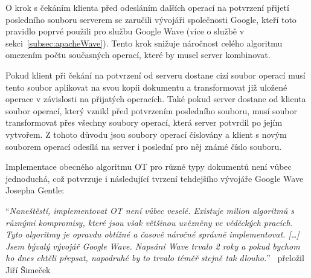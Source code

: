 O krok s čekáním klienta před odesláním dalších operací na potvrzení přijetí posledního souboru serverem se zaručili vývojáři společnosti Google, kteří toto pravidlo poprvé použili pro službu Google Wave (více o službě v sekci~\ref{subsec:apacheWave}).
Tento krok snižuje náročnost celého algoritmu omezením počtu současných operací, které by musel server kombinovat.~\cite{ot:waveAddition}

Pokud klient při čekání na potvrzení od serveru dostane cizí soubor operací musí tento soubor aplikovat na svou kopii dokumentu a transformovat již uložené operace v závislosti na přijatých operacích.
Také pokud server dostane od klienta soubor operací, který vznikl před potvrzením posledního souboru, musí soubor transformovat přes všechny soubory operací, která server potvrdil po jejím vytvořem.
Z tohoto důvodu jsou soubory operací číslovány a klient s novým souborem operací odesílá na server i poslední pro něj známé číslo souboru.

Implementace obecného algoritmu \gls{OT} pro různé typy dokumentů není vůbec jednoduchá, což potvrzuje i následující tvrzení tehdejšího vývojáře Google Wave Josepha Gentle:

\enquote{\textit{Naneštěstí, implementovat OT není vůbec veselé.
Existuje milion algoritmů s různými kompromisy, které jsou však většinou uvězněny ve věděckých pracích.
Tyto algoritmy je opravdu obtížné a časově náročné správně implementovat.
[\ldots]
Jsem bývalý vývojář Google Wave.
Napsání Wave trvalo 2 roky a pokud bychom ho dnes chtěli přepsat, napodruhé by to trvalo téměř stejně tak dlouho.}}~\cite{ot:sharejs} přeložil Jiří Šimeček
